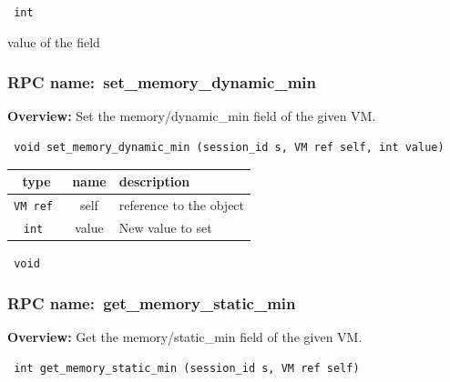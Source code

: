 \vspace{0.3cm}

{\tt 
int
}


value of the field
\vspace{0.3cm}
\vspace{0.3cm}
\vspace{0.3cm}
\subsubsection{RPC name:~set\_memory\_dynamic\_min}

{\bf Overview:} 
Set the memory/dynamic\_min field of the given VM.

\begin{verbatim} void set_memory_dynamic_min (session_id s, VM ref self, int value)\end{verbatim}



 
\vspace{0.3cm}
\begin{tabular}{|c|c|p{7cm}|}
 \hline
{\bf type} & {\bf name} & {\bf description} \\ \hline
{\tt VM ref } & self & reference to the object \\ \hline 

{\tt int } & value & New value to set \\ \hline 

\end{tabular}

\vspace{0.3cm}

{\tt 
void
}



\vspace{0.3cm}
\vspace{0.3cm}
\vspace{0.3cm}
\subsubsection{RPC name:~get\_memory\_static\_min}

{\bf Overview:} 
Get the memory/static\_min field of the given VM.

\begin{verbatim} int get_memory_static_min (session_id s, VM ref self)\end{verbatim}


